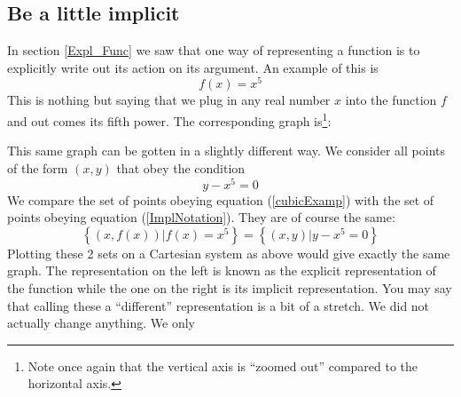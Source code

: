 \subsection{Be a little implicit}

\noindent In section \ref{Expl_Func} we saw that one way of representing a function is to explicitly write out its action on its argument. An example of this is
\begin{equation}
\label{cubicExamp}
f(x) = x^5
\end{equation}
\noindent This is nothing but saying that we plug in any real number $x$ into the function $f$ and out comes its fifth power. The corresponding graph is\footnote{ Note once again that the vertical axis is "`zoomed out"' compared to the horizontal axis.}:
\begin{center}
\end{center}
\noindent This same graph can be gotten in a slightly different way. We consider all points of the form $\left( x,y \right)$ that obey the condition
\begin{equation}
\label{ImplNotation}
y-x^5 = 0
\end{equation}
We compare the set of points obeying equation (\ref{cubicExamp}) with the set of points obeying equation (\ref{ImplNotation}). They are of course the same:
$$
\left\{ \left(x,f(x)\right)| f(x) = x^5  \right\} = \left\{ \left( x,y \right) | y - x^5 = 0 \right\}
$$
Plotting these 2 sets on a Cartesian system as above would give exactly the same graph. The representation on the left is known as the explicit representation of the function while the one on the right is its implicit representation. You may say that calling these a "`different"' representation is a bit of a stretch. We did not actually change anything. We only
